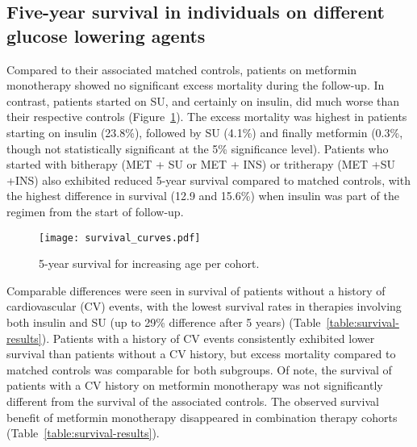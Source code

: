 \subsection{Five-year survival in individuals on different glucose lowering agents}
Compared to their associated matched controls, patients on metformin monotherapy showed no significant excess mortality during the follow-up. In contrast, patients started on SU, and certainly on insulin, did much worse than their respective controls (Figure~\ref{fig:survival-curves}). The excess mortality was highest in patients starting on insulin (23.8\%), followed by SU (4.1\%) and finally metformin (0.3\%, though not statistically significant at the 5\% significance level). Patients who started with bitherapy (MET + SU or MET + INS) or tritherapy (MET +SU +INS) also exhibited reduced 5-year survival compared to matched controls, with the highest difference in survival (12.9 and 15.6\%) when insulin was part of the regimen from the start of follow-up. 

\begin{figure}[h]
  \centering
  \texttt{[image: survival\_curves.pdf]}
  \caption{5-year survival for increasing age per cohort.} \label{fig:survival-curves}
\end{figure}

Comparable differences were seen in survival of patients without a history of cardiovascular (CV) events, with the lowest survival rates in therapies involving both insulin and SU (up to 29\% difference after 5 years) (Table~\ref{table:survival-results}). Patients with a history of CV events consistently exhibited lower survival than patients without a CV history, but excess mortality compared to matched controls was comparable for both subgroups. Of note, the survival of patients with a CV history on metformin monotherapy was not significantly different from the survival of the associated controls.  The observed survival benefit of metformin monotherapy disappeared in combination therapy cohorts (Table~\ref{table:survival-results}).

